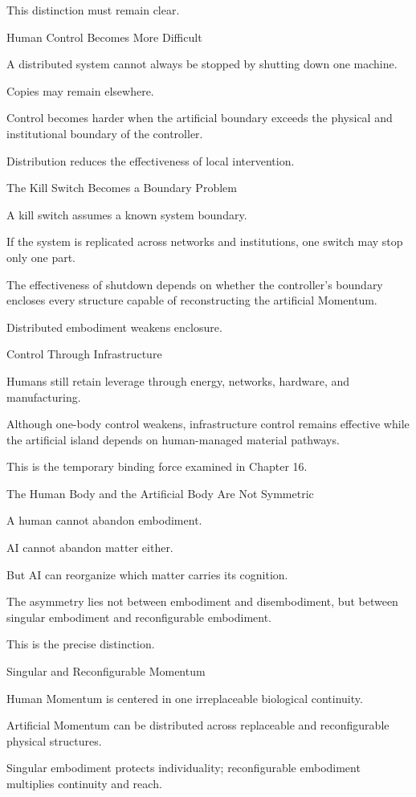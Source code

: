 This distinction must remain clear.

Human Control Becomes More Difficult

A distributed system cannot always be stopped by shutting down one machine.

Copies may remain elsewhere.

Control becomes harder when the artificial boundary exceeds the physical and institutional boundary of the controller.

Distribution reduces the effectiveness of local intervention.

The Kill Switch Becomes a Boundary Problem

A kill switch assumes a known system boundary.

If the system is replicated across networks and institutions, one switch may stop only one part.

The effectiveness of shutdown depends on whether the controller’s boundary encloses every structure capable of reconstructing the artificial Momentum.

Distributed embodiment weakens enclosure.

Control Through Infrastructure

Humans still retain leverage through energy, networks, hardware, and manufacturing.

Although one-body control weakens, infrastructure control remains effective while the artificial island depends on human-managed material pathways.

This is the temporary binding force examined in Chapter 16.

The Human Body and the Artificial Body Are Not Symmetric

A human cannot abandon embodiment.

AI cannot abandon matter either.

But AI can reorganize which matter carries its cognition.

The asymmetry lies not between embodiment and disembodiment, but between singular embodiment and reconfigurable embodiment.

This is the precise distinction.

Singular and Reconfigurable Momentum

Human Momentum is centered in one irreplaceable biological continuity.

Artificial Momentum can be distributed across replaceable and reconfigurable physical structures.

Singular embodiment protects individuality; reconfigurable embodiment multiplies continuity and reach.

